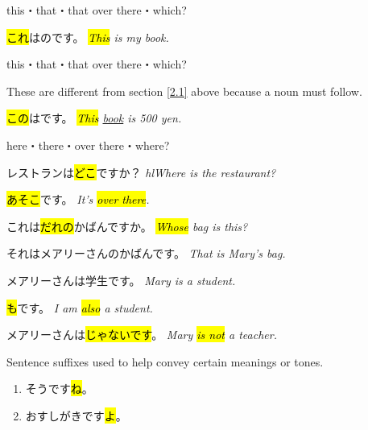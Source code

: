     {
    this・that・that over there・which?

    \hl{これ}はのです。
    \textit{\hl{This} is my book.}
    }

    {
    this・that・that over there・which?
    
    These are different from section \ref{2.1} above because a noun must follow.

    \hl{この}はです。
    \textit{\hl{This} \underline{book} is 500 yen.}
    }
    
    {
    here・there・over there・where?

    レストランは\hl{どこ}ですか？
    \textit{hl{Where} is the restaurant?}

    \hl{あそこ}です。
    \textit{It's \hl{over there}.}
    }

    {
    これは\hl{だれの}かばんですか。
    \textit{\hl{Whose} bag is this?}

    それはメアリーさんのかばんです。
    \textit{That is Mary's bag.}
    }
    
    {
    メアリーさんは学生です。
    \textit{Mary is a student.}

    \hl{も}です。
    \textit{I am \hl{also} a student.}
    }
    
    {
    メアリーさんは\hl{じゃないです}。
    \textit{Mary \hl{is not} a teacher.} 
    }

    {
    Sentence suffixes used to help convey certain meanings or tones.
    \begin{enumerate}
        \item そうです\hl{ね}。
        \item おすしがきです\hl{よ}。
    \end{enumerate}
    }
